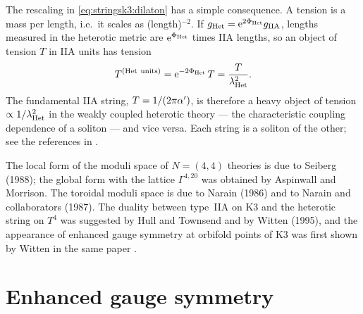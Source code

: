 The rescaling in \eqref{eq:stringsk3:dilaton} has a simple consequence. A tension is a mass
per length, i.e.\ it scales as (length)$^{-2}$. If $g_{\rm Het}=\mathrm{e}^{2\Phi_{\rm Het}}g_{\rm IIA}$,
lengths measured in the heterotic metric are $\mathrm{e}^{\Phi_{\rm Het}}$ times IIA lengths, so an
object of tension $T$ in IIA units has tension
\begin{equation}\label{eq:stringsk3:tension}
  T^{(\rm Het\ units)}=\mathrm{e}^{-2\Phi_{\rm Het}}\,T=\frac{T}{\lambda_{\rm Het}^2} .
\end{equation}
The fundamental IIA string, $T=1/(2\pi\alpha')$, is therefore a heavy object of tension
$\propto1/\lambda_{\rm Het}^2$ in the weakly coupled heterotic theory --- the characteristic
coupling dependence of a soliton --- and vice versa. Each string is a soliton of the other;
see the references in .

\begin{historybox}
The local form of the moduli space of $N=(4,4)$ theories is due to Seiberg (1988); the global
form with the lattice $\Gamma^{4,20}$ was obtained by Aspinwall and Morrison. The toroidal
moduli space is due to Narain (1986) and to Narain and collaborators (1987). The duality
between type~IIA on K3 and the heterotic string on $T^4$ was suggested by Hull and Townsend
and by Witten (1995), and the appearance of enhanced gauge symmetry at orbifold points of K3
was first shown by Witten in the same paper .
\end{historybox}

\section{Enhanced gauge symmetry}\label{sec:stringsk3:enhanced}

